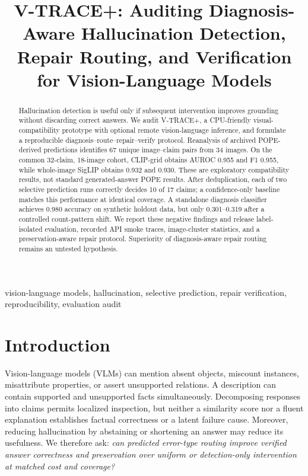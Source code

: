 \documentclass[conference]{IEEEtran}
\begin{document}
\title{V-TRACE+: Auditing Diagnosis-Aware Hallucination Detection,\\Repair Routing, and Verification for Vision-Language Models}
\author{
}
\maketitle

\begin{abstract}
Hallucination detection is useful only if subsequent intervention improves
grounding without discarding correct answers. We audit V-TRACE+, a CPU-friendly
visual-compatibility prototype with optional remote vision-language inference,
and formulate a reproducible diagnosis--route--repair--verify protocol.
Reanalysis of archived POPE-derived predictions identifies 67 unique
image--claim pairs from 34 images. On the common 32-claim, 18-image cohort,
CLIP-grid obtains AUROC 0.955 and F1 0.955, while whole-image SigLIP obtains
0.932 and 0.930. These are exploratory compatibility results, not standard
generated-answer POPE results. After deduplication, each of two selective
prediction runs correctly decides 10 of 17 claims; a confidence-only baseline
matches this performance at identical coverage. A standalone diagnosis
classifier achieves 0.980 accuracy on synthetic holdout data, but only
0.301--0.319 after a controlled count-pattern shift. We report these negative
findings and release label-isolated evaluation, recorded API smoke traces,
image-cluster statistics, and a preservation-aware repair protocol. Superiority
of diagnosis-aware repair routing remains an untested hypothesis.
\end{abstract}
\begin{IEEEkeywords}
vision-language models, hallucination, selective prediction, repair verification,
reproducibility, evaluation audit
\end{IEEEkeywords}

\section{Introduction}
Vision-language models (VLMs) can mention absent objects, miscount instances,
misattribute properties, or assert unsupported relations. A description can
contain supported and unsupported facts simultaneously. Decomposing responses
into claims permits localized inspection, but neither a similarity score nor
a fluent explanation establishes factual correctness or a latent failure cause.
Moreover, reducing hallucination by abstaining or shortening an answer may
reduce its usefulness. We therefore ask: \emph{can predicted error-type routing
improve verified answer correctness and preservation over uniform or
detection-only intervention at matched cost and coverage?}
\end{document}
